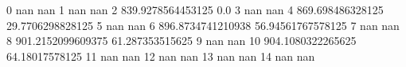 0 nan nan
1 nan nan
2 839.9278564453125 0.0
3 nan nan
4 869.698486328125 29.7706298828125
5 nan nan
6 896.8734741210938 56.94561767578125
7 nan nan
8 901.2152099609375 61.287353515625
9 nan nan
10 904.1080322265625 64.18017578125
11 nan nan
12 nan nan
13 nan nan
14 nan nan
